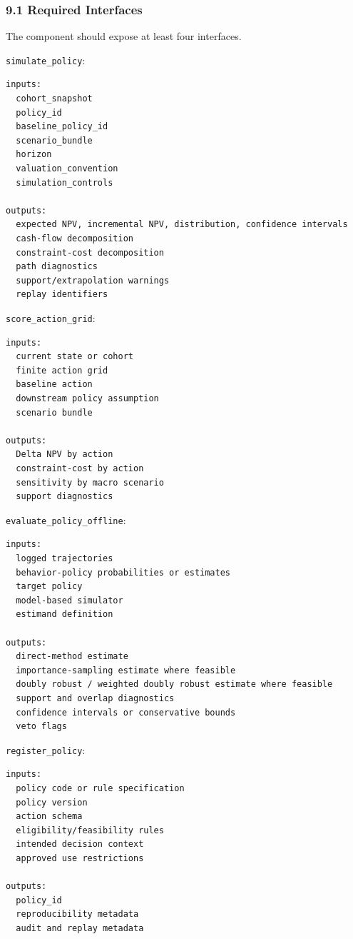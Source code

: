 \documentclass[
]{article}
\begin{document}
\hypertarget{required-interfaces}{%
\subsubsection{9.1 Required Interfaces}\label{required-interfaces}}

The component should expose at least four interfaces.

\texttt{simulate\_policy}:

\begin{verbatim}
inputs:
  cohort_snapshot
  policy_id
  baseline_policy_id
  scenario_bundle
  horizon
  valuation_convention
  simulation_controls

outputs:
  expected NPV, incremental NPV, distribution, confidence intervals
  cash-flow decomposition
  constraint-cost decomposition
  path diagnostics
  support/extrapolation warnings
  replay identifiers
\end{verbatim}

\texttt{score\_action\_grid}:

\begin{verbatim}
inputs:
  current state or cohort
  finite action grid
  baseline action
  downstream policy assumption
  scenario bundle

outputs:
  Delta NPV by action
  constraint-cost by action
  sensitivity by macro scenario
  support diagnostics
\end{verbatim}

\texttt{evaluate\_policy\_offline}:

\begin{verbatim}
inputs:
  logged trajectories
  behavior-policy probabilities or estimates
  target policy
  model-based simulator
  estimand definition

outputs:
  direct-method estimate
  importance-sampling estimate where feasible
  doubly robust / weighted doubly robust estimate where feasible
  support and overlap diagnostics
  confidence intervals or conservative bounds
  veto flags
\end{verbatim}

\texttt{register\_policy}:

\begin{verbatim}
inputs:
  policy code or rule specification
  policy version
  action schema
  eligibility/feasibility rules
  intended decision context
  approved use restrictions

outputs:
  policy_id
  reproducibility metadata
  audit and replay metadata
\end{verbatim}
\end{document}
